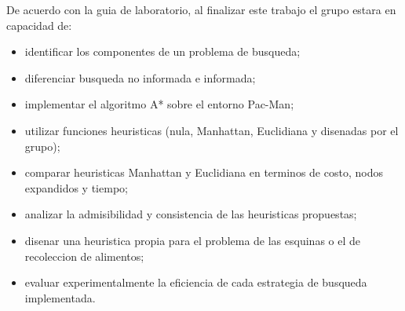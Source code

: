 De acuerdo con la guia de laboratorio, al finalizar este trabajo el grupo estara en capacidad de:

\begin{itemize}
    \item identificar los componentes de un problema de busqueda;
    \item diferenciar busqueda no informada e informada;
    \item implementar el algoritmo A* sobre el entorno Pac-Man;
    \item utilizar funciones heuristicas (nula, Manhattan, Euclidiana y disenadas por el grupo);
    \item comparar heuristicas Manhattan y Euclidiana en terminos de costo, nodos expandidos y tiempo;
    \item analizar la admisibilidad y consistencia de las heuristicas propuestas;
    \item disenar una heuristica propia para el problema de las esquinas o el de recoleccion de alimentos;
    \item evaluar experimentalmente la eficiencia de cada estrategia de busqueda implementada.
\end{itemize}
